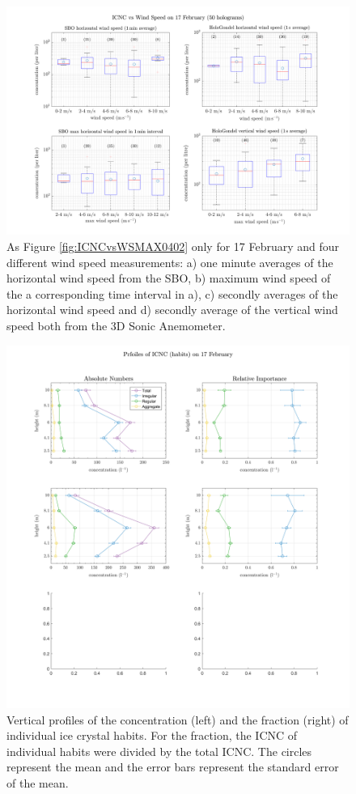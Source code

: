 \documentclass[draft,linenumbers]{agujournal}
\begin{document}
\begin{figure}[t]
 \centering
 	\includegraphics[width=14cm]{1702_OverviewWS.png}
 \caption{As Figure \ref{fig:ICNCvsWSMAX0402} only for 17 February and four different wind speed measurements: a) one minute averages of the horizontal wind speed from the SBO, b) maximum wind speed of the a corresponding time interval in a), c) secondly averages of the horizontal wind speed and d) secondly average of the vertical wind speed both from the 3D Sonic Anemometer.}
 \label{fig:ICNCvsWind1702}
\end{figure}

\begin{figure}[t]
 \centering
 	\includegraphics[width=14cm]{1702_habitsHeight.png}
 \caption{Vertical profiles of the concentration (left) and the fraction (right) of individual ice crystal habits. For the fraction, the ICNC of individual habits were divided by the total ICNC. The circles represent the mean and the error bars represent the standard error of the mean. }
 \label{fig:profilesHabits1702}
\end{figure}
\end{document}
